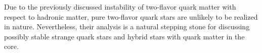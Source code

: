 Due to the previously discussed instability of two-flavor quark matter with respect to hadronic matter,
pure two-flavor quark stars are unlikely to be realized in nature.
Nevertheless, their analysis is a natural stepping stone for discussing possibly stable strange quark stars and hybrid stars with quark matter in the core.


